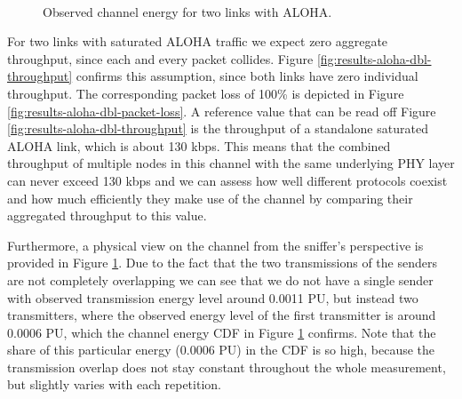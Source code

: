 \begin{figure}[tb]
	\label{fig:results-aloha-dbl-channel-meta}
	\begin{center}
		\\
	\end{center}
	\caption{Observed channel energy for two links with ALOHA.}
\end{figure}

For two links with saturated ALOHA traffic we expect zero aggregate throughput, since each and every packet collides. Figure \ref{fig:results-aloha-dbl-throughput} confirms this assumption, since both links have zero individual throughput. The corresponding packet loss of 100\% is depicted in Figure \ref{fig:results-aloha-dbl-packet-loss}. A reference value that can be read off Figure \ref{fig:results-aloha-dbl-throughput} is the throughput of a standalone saturated ALOHA link, which is about 130 kbps. This means that the combined throughput of multiple nodes in this channel with the same underlying PHY layer can never exceed 130 kbps and we can assess how well different protocols coexist and how much efficiently they make use of the channel by comparing their aggregated throughput to this value.

Furthermore, a physical view on the channel from the sniffer's perspective is provided in Figure \ref{fig:results-aloha-dbl-channel-meta}. Due to the fact that the two transmissions of the senders are not completely overlapping we can see that we do not have a single sender with observed transmission energy level around 0.0011 PU, but instead two transmitters, where the observed energy level of the first transmitter is around 0.0006 PU, which the channel energy CDF in Figure \ref{fig:results-aloha-dbl-channel-meta} confirms. Note that the share of this particular energy (0.0006 PU) in the CDF is so high, because the transmission overlap does not stay constant throughout the whole measurement, but slightly varies with each repetition.

